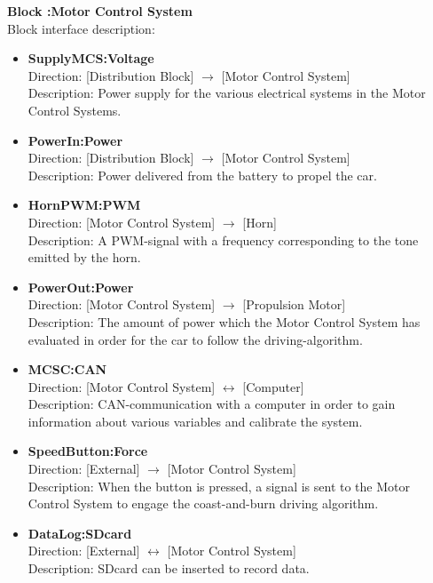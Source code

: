 \textbf{Block :Motor Control System}\\
Block interface description:
\begin{itemize}
	\item \textbf{SupplyMCS:Voltage}\\
	Direction: [Distribution Block] $\rightarrow$ [Motor Control System]\\
	Description: Power supply for the various electrical systems in the Motor Control Systems.
	\item \textbf{PowerIn:Power}\\
	Direction: [Distribution Block] $\rightarrow$ [Motor Control System]\\
	Description: Power delivered from the battery to propel the car.
	\item \textbf{HornPWM:PWM}\\
	Direction: [Motor Control System] $\rightarrow$ [Horn]\\
	Description: A PWM-signal with a frequency corresponding to the tone emitted by the horn.
	\item \textbf{PowerOut:Power}\\
	Direction: [Motor Control System] $\rightarrow$ [Propulsion Motor]\\
	Description: The amount of power which the Motor Control System has evaluated in order for the car to follow the driving-algorithm.
	\item \textbf{MCSC:CAN}\\
	Direction: [Motor Control System] $\leftrightarrow$ [Computer]\\
	Description: CAN-communication with a computer in order to gain information about various variables and calibrate the system.
	\item \textbf{SpeedButton:Force}\\
	Direction: [External] $\rightarrow$ [Motor Control System]\\
	Description: When the button is pressed, a signal is sent to the Motor Control System to engage the coast-and-burn driving algorithm.
	\item \textbf{DataLog:SDcard}\\
	Direction: [External] $\leftrightarrow$ [Motor Control System]\\
	Description: SDcard can be inserted to record data.
\end{itemize}

